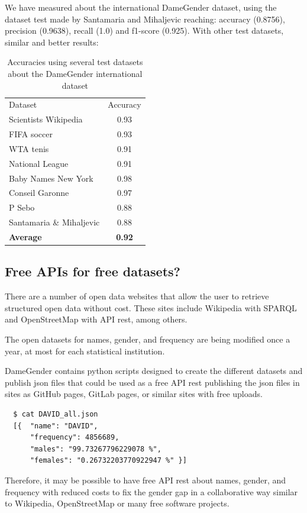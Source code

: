\documentclass[a4paper]{article}
\begin{document}
We have measured about the international DameGender dataset,
using the dataset test made by Santamaria and Mihaljevic
\cite{10.7717/peerj-cs.156} reaching: accuracy (0.8756), precision
(0.9638), recall (1.0) and f1-score (0.925). With other test datasets,
similar and better results:

\begin{table}[t]
  \footnotesize
  \begin{tabular}[]{lc}
    \hline
    Dataset & Accuracy  \tabularnewline
    Scientists Wikipedia & 0.93 \tabularnewline
    FIFA soccer & 0.93 \tabularnewline
    WTA tenis & 0.91 \tabularnewline
    National League & 0.91 \tabularnewline
    Baby Names New York & 0.98 \tabularnewline    
    Conseil Garonne & 0.97 \tabularnewline
    P Sebo\cite{sebo2021performance} & 0.88 \tabularnewline
    Santamaria \& Mihaljevic\cite{10.7717/peerj-cs.156} & 0.88 \tabularnewline
    \textbf{Average} & \textbf{0.92} \tabularnewline    
  \end{tabular}
  \caption{Accuracies using several test datasets about the DameGender international dataset}
  \label{table:SeveralTests}
\end{table}

\subsection{Free APIs for free datasets?}
\label{sec:freeapis}

There are a number of open data websites that allow the user to retrieve structured open data without cost. These sites include Wikipedia with SPARQL and OpenStreetMap with API rest, among others.

The open datasets for names, gender, and frequency are being modified once a year, at most for each statistical institution.

DameGender contains python scripts designed to create the
different datasets and publish json files that could be used as a free
API rest publishing the json files in sites as GitHub pages, GitLab
pages, or similar sites with free uploads.

\begin{verbatim}
  $ cat DAVID_all.json
  [{  "name": "DAVID",
      "frequency": 4856689,
      "males": "99.73267796229078 %",
      "females": "0.26732203770922947 %" }]
\end{verbatim}

Therefore, it may be possible to have free API rest about names,
gender, and frequency with reduced costs to fix the gender gap
in a collaborative way similar to Wikipedia, OpenStreetMap or
many free software projects.
\end{document}
